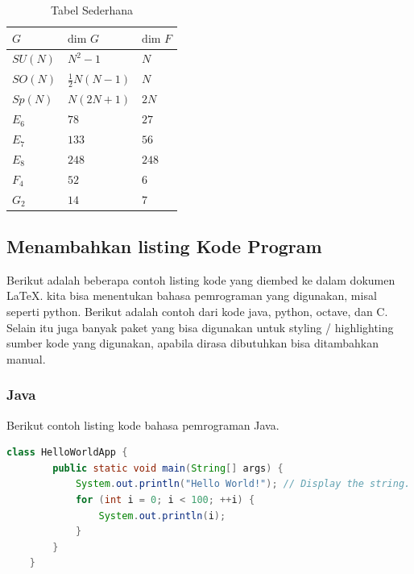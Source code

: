 \begin{table}[H]
	\caption{Tabel Sederhana}
	\label{tab:tabelx}
	\begin{center}
		\begin{tabularx}{0.8\textwidth} {
				|>{\raggedright\arraybackslash}X
				|>{\raggedright\arraybackslash}X
				|>{\raggedright\arraybackslash}X
				|}
			\hline
			$G$     & $\text{dim }G$      & $\text{dim }F$ \\
			\hline
			$SU(N)$ & $N^2 -1$            & $N$            \\
			$SO(N)$ & $\frac{1}{2}N(N-1)$ & $N$            \\
			$Sp(N)$ & $N(2N+1)$           & $2N$           \\
			$E_6$   & $78$                & $27$           \\
			$E_7$   & $133$               & $56$           \\
			$E_8$   & $248$               & $248$          \\
			$F_4$   & $52$                & $6$            \\
			$G_2$   & $14$                & $7$            \\
			\hline
		\end{tabularx}
	\end{center}
\end{table}

\subsection{Menambahkan listing Kode Program}
Berikut adalah beberapa contoh listing kode yang diembed ke dalam dokumen \LaTeX. kita bisa menentukan bahasa pemrograman yang digunakan, misal seperti python. Berikut adalah contoh dari kode java, python, octave, dan C. Selain itu juga banyak paket yang bisa digunakan untuk styling / highlighting sumber kode yang digunakan, apabila dirasa dibutuhkan bisa ditambahkan manual.

\subsubsection{Java}
Berikut contoh listing kode bahasa pemrograman Java.
\begin{lstlisting}[language=java]
    class HelloWorldApp {
        public static void main(String[] args) {
            System.out.println("Hello World!"); // Display the string.
            for (int i = 0; i < 100; ++i) {
                System.out.println(i);
            }
        }
    }
    \end{lstlisting}

